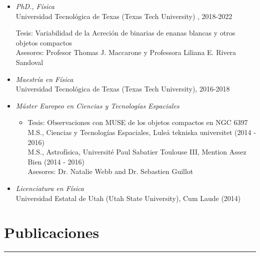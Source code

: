 \documentclass[letterpaper,10pt]{article}
\begin{document}
\begin{itemize}[label=$\blacktriangleright$]



  \item \emph{PhD., F\'isica}  \\
   Universidad Tecnol\'ogica de Texas (Texas Tech University) , 2018-2022
      \begin{itemize}[label=]
     Tesis: Variabilidad de la Acreci\'on de binarias de enanas blancas y otros objetos compactos  \\
     Asesores: Profesor Thomas J. Maccarone y Professora Liliana E. Rivera Sandoval 
      \end{itemize}





  \item \emph{Maestr\'ia en F\'isica}  \\
   Universidad Tecnol\'ogica de Texas (Texas Tech University), 2016-2018



  \item \emph{M\'aster Europeo en Ciencias y Tecnolog\'ias Espaciales} 
  \begin{itemize}[label=]
      \vspace{-.05cm}
      \item Tesis: Observaciones con MUSE de los objetos compactos en NGC 6397 \\
      M.S., Ciencias y Tecnolog\'ias Espaciales, Lule\r a tekniska universitet  (2014 - 2016) \\
      M.S., Astrof\'isica, Universit\'e Paul Sabatier Toulouse III, Mention Assez Bien (2014 - 2016) \\
      Asesores: Dr. Natalie Webb and Dr. Sebastien Guillot
  \end{itemize}




  \item \emph{Licenciatura en F\'isica}  \\
   Universidad Estatal de Utah (Utah State University), Cum Laude (2014)

\end{itemize}







\section*{Publicaciones}%
\hrule
\vspace{.3 cm}
\end{document}
